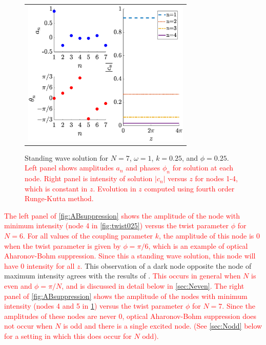 \documentclass[reprint, amsmath,amssymb,aps,pra]{revtex4-2}
\renewcommand{\revised}[1]{ \textcolor{red}{#1} }
\begin{document}
\begin{figure}
    \begin{center}
    \begin{tabular}{c}
    \includegraphics[width=8cm]{twist025N7.eps}
    \end{tabular}
    \end{center}
    \caption{Standing wave solution for $N = 7$, $\omega = 1$, $k = 0.25$, and $\phi = 0.25$. \revised{Left panel shows amplitudes $a_n$ and phases $\phi_n$ for solution at each node. Right panel is intensity of solution $|c_n|$ versus $z$ for nodes 1-4, which is constant in $z$. Evolution in $z$ computed using fourth order Runge-Kutta method.} }
    \label{fig:twist025N7}
    \end{figure}

\revised{The left panel of \cref{fig:ABsuppression} shows the amplitude of the node with minimum intensity (node 4 in \cref{fig:twist025}) versus the twist parameter $\phi$ for $N=6$. For all values of the coupling parameter $k$, the amplitude of this node is 0 when the twist parameter is given by $\phi = \pi/6$, which is an example of optical Aharonov-Bohm suppression. Since this a standing wave solution, this node will have 0 intensity for all $z$.} This observation of a dark node opposite the node of maximum intensity agrees with the results of \cite{castro2016,Parto2017}. \revised{This occurs in general when $N$ is even and $\phi = \pi/N$, and is discussed in detail below in \cref{sec:Neven}. The right panel of \cref{fig:ABsuppression} shows the amplitude of the nodes with minimum intensity (nodes 4 and 5 in \cref{fig:twist025N7}) versus the twist parameter $\phi$ for $N=7$. Since the amplitudes of these nodes are never 0, optical Aharonov-Bohm suppression does not occur when $N$ is odd and there is a single excited node. (See \cref{sec:Nodd} below for a setting in which this does occur for $N$ odd). }
\end{document}
